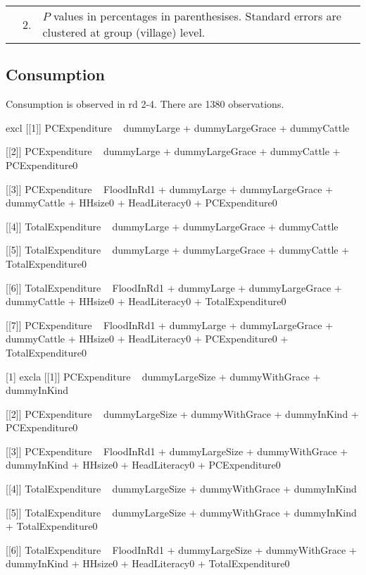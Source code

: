 \begin{minipage}[t]{14cm}
\begin{tabular}{>{\hfill\scriptsize}p{1cm}<{}>{\hfill\scriptsize}p{.25cm}<{}>{\scriptsize}p{12cm}<{\hfill}}
& 2. & $P$ values in percentages in parenthesises. Standard errors are clustered at group (village) level.
\end{tabular}
\end{minipage}
\subsection{Consumption}



Consumption is observed in rd 2-4. There are 1380 observations. 




\begin{Schunk}
\begin{Soutput}
[1] excl
[[1]]
PCExpenditure ~ dummyLarge + dummyLargeGrace + dummyCattle

[[2]]
PCExpenditure ~ dummyLarge + dummyLargeGrace + dummyCattle + 
    PCExpenditure0

[[3]]
PCExpenditure ~ FloodInRd1 + dummyLarge + dummyLargeGrace + dummyCattle + 
    HHsize0 + HeadLiteracy0 + PCExpenditure0

[[4]]
TotalExpenditure ~ dummyLarge + dummyLargeGrace + dummyCattle

[[5]]
TotalExpenditure ~ dummyLarge + dummyLargeGrace + dummyCattle + 
    TotalExpenditure0

[[6]]
TotalExpenditure ~ FloodInRd1 + dummyLarge + dummyLargeGrace + 
    dummyCattle + HHsize0 + HeadLiteracy0 + TotalExpenditure0

[[7]]
PCExpenditure ~ FloodInRd1 + dummyLarge + dummyLargeGrace + dummyCattle + 
    HHsize0 + HeadLiteracy0 + PCExpenditure0 + TotalExpenditure0

[1] excla
[[1]]
PCExpenditure ~ dummyLargeSize + dummyWithGrace + dummyInKind

[[2]]
PCExpenditure ~ dummyLargeSize + dummyWithGrace + dummyInKind + 
    PCExpenditure0

[[3]]
PCExpenditure ~ FloodInRd1 + dummyLargeSize + dummyWithGrace + 
    dummyInKind + HHsize0 + HeadLiteracy0 + PCExpenditure0

[[4]]
TotalExpenditure ~ dummyLargeSize + dummyWithGrace + dummyInKind

[[5]]
TotalExpenditure ~ dummyLargeSize + dummyWithGrace + dummyInKind + 
    TotalExpenditure0

[[6]]
TotalExpenditure ~ FloodInRd1 + dummyLargeSize + dummyWithGrace + 
    dummyInKind + HHsize0 + HeadLiteracy0 + TotalExpenditure0


\end{Soutput}
\end{Schunk}
